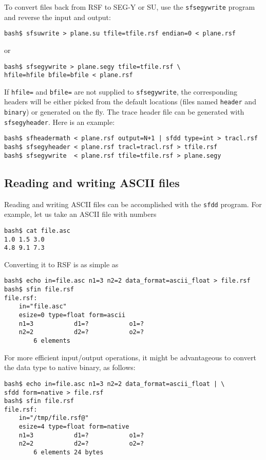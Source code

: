 
To convert files back from RSF to SEG-Y or SU, use the \texttt{sfsegywrite}
program and reverse the input and output:
\begin{verbatim}
bash$ sfsuwrite > plane.su tfile=tfile.rsf endian=0 < plane.rsf
\end{verbatim}
or
\begin{verbatim}
bash$ sfsegywrite > plane.segy tfile=tfile.rsf \
hfile=hfile bfile=bfile < plane.rsf
\end{verbatim}

If \texttt{hfile=} and \texttt{bfile=} are not supplied to
\texttt{sfsegywrite}, the corresponding headers will be either picked
from the default locations (files named \texttt{header} and
\texttt{binary}) or generated on the fly. The trace header file can be
generated with \texttt{sfsegyheader}. Here is an example:
\begin{verbatim}
bash$ sfheadermath < plane.rsf output=N+1 | sfdd type=int > tracl.rsf
bash$ sfsegyheader < plane.rsf tracl=tracl.rsf > tfile.rsf
bash$ sfsegywrite  < plane.rsf tfile=tfile.rsf > plane.segy
\end{verbatim}


\subsection{Reading and writing ASCII files}

Reading and writing ASCII files can be accomplished with the \texttt{sfdd}
program. For example, let us take an ASCII file with numbers
\begin{verbatim}
bash$ cat file.asc
1.0 1.5 3.0
4.8 9.1 7.3
\end{verbatim}
Converting it to RSF is as simple as
\begin{verbatim}
bash$ echo in=file.asc n1=3 n2=2 data_format=ascii_float > file.rsf
bash$ sfin file.rsf
file.rsf:
    in="file.asc"
    esize=0 type=float form=ascii
    n1=3           d1=?           o1=?
    n2=2           d2=?           o2=?
        6 elements
\end{verbatim}
For more efficient input/output operations, it might be advantageous to
convert the data type to native binary, as follows:
\begin{verbatim}
bash$ echo in=file.asc n1=3 n2=2 data_format=ascii_float | \
sfdd form=native > file.rsf
bash$ sfin file.rsf
file.rsf:
    in="/tmp/file.rsf@"
    esize=4 type=float form=native
    n1=3           d1=?           o1=?
    n2=2           d2=?           o2=?
        6 elements 24 bytes
\end{verbatim}


